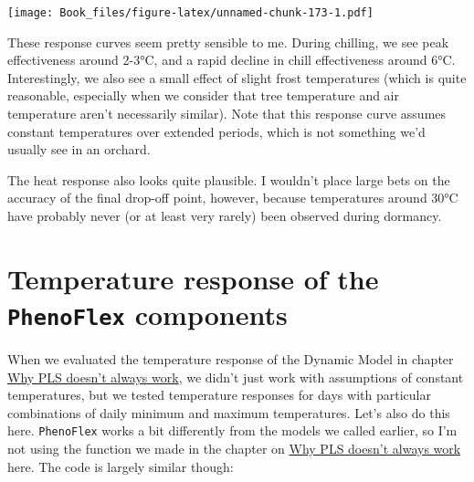 \documentclass[
]{book}
\begin{document}
\texttt{[image: Book\_files/figure-latex/unnamed-chunk-173-1.pdf]}

These response curves seem pretty sensible to me. During chilling, we see peak effectiveness around 2-3°C, and a rapid decline in chill effectiveness around 6°C. Interestingly, we also see a small effect of slight frost temperatures (which is quite reasonable, especially when we consider that tree temperature and air temperature aren't necessarily similar). Note that this response curve assumes constant temperatures over extended periods, which is not something we'd usually see in an orchard.

The heat response also looks quite plausible. I wouldn't place large bets on the accuracy of the final drop-off point, however, because temperatures around 30°C have probably never (or at least very rarely) been observed during dormancy.

\hypertarget{temperature-response-of-the-phenoflex-components}{%
\section{\texorpdfstring{Temperature response of the \texttt{PhenoFlex} components}{Temperature response of the PhenoFlex components}}\label{temperature-response-of-the-phenoflex-components}}

When we evaluated the temperature response of the Dynamic Model in chapter \protect\hyperlink{pls_chillforce_reflection}{Why PLS doesn't always work}, we didn't just work with assumptions of constant temperatures, but we tested temperature responses for days with particular combinations of daily minimum and maximum temperatures. Let's also do this here. \texttt{PhenoFlex} works a bit differently from the models we called earlier, so I'm not using the function we made in the chapter on \protect\hyperlink{pls_chillforce_reflection}{Why PLS doesn't always work} here. The code is largely similar though:
\end{document}
